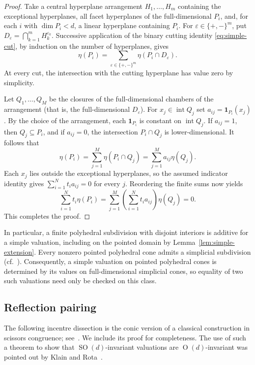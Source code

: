 \documentclass[11pt]{article}
\newcommand{\SOn}[1]{\operatorname{SO}(#1)}
\newcommand{\On}[1]{\operatorname{O}(#1)}
\newcommand{\inter}{\operatorname{int}}
\theoremstyle{plain}
\theoremstyle{definition}
\begin{document}
\begin{proof}
Take a central hyperplane arrangement $H_1,\ldots,H_m$ containing the exceptional
hyperplanes, all facet hyperplanes of the full-dimensional $P_i$,
and, for each $i$ with $\dim P_i<d$, a linear hyperplane containing $P_i$.
For $\varepsilon\in\{+,-\}^m$, put
$D_\varepsilon=\bigcap_{k=1}^m H_k^{\varepsilon_k}$.
Successive application of the binary cutting identity
\eqref{eq:simple-cut}, by induction on the number of hyperplanes, gives
\[
  \eta(P_i)=\sum_{\varepsilon\in\{+,-\}^m}
    \eta(P_i\cap D_\varepsilon).
\]
At every cut, the intersection with the cutting hyperplane has value
zero by simplicity.

Let $Q_1,\ldots,Q_M$ be the closures of the full-dimensional chambers of the arrangement (that is, the 
full-dimensional $D_\varepsilon$).
For $x_j\in\inter Q_j$ set $a_{ij}=\mathbf1_{P_i}(x_j)$.
By the choice of the arrangement, each $\mathbf1_{P_i}$ is constant on
$\inter Q_j$.  If $a_{ij}=1$, then $Q_j\subseteq P_i$, and 
if $a_{ij}=0$, the intersection $P_i\cap Q_j$ is lower-dimensional.
It follows that
\[
  \eta(P_i)=\sum_{j=1}^M\eta(P_i\cap Q_j)
           =\sum_{j=1}^M a_{ij}\eta(Q_j).
\]
Each $x_j$ lies outside the exceptional hyperplanes, so the assumed
indicator identity gives $\sum_{i=1}^N t_i a_{ij}=0$ for every $j$.
Reordering the finite sums now yields
\[
  \sum_{i=1}^N t_i\eta(P_i)
  =\sum_{j=1}^M\left(\sum_{i=1}^N t_i a_{ij}\right)\eta(Q_j)
  =0.
\]
This completes the proof.
\end{proof}

In particular, a finite polyhedral subdivision with disjoint interiors
is additive for a simple valuation, including on the pointed domain
by Lemma~\ref{lem:simple-extension}.  Every nonzero pointed polyhedral
cone admits a simplicial subdivision (cf.~\cite[Section~2.6, p.~48]{Fulton93:Toric-Varieties}).
Consequently, a simple valuation on pointed polyhedral cones is determined
by its values on full-dimensional simplicial cones, so equality of two
such valuations need only be checked on this class.

\subsection{Reflection pairing}

The following incentre dissection is the conic version of a classical
construction in scissors congruence; see~\cite{Sah79:Hilberts-Third}.
We include its proof for completeness. The use of such a theorem to show that
$\SOn d$-invariant valuations are $\On d$-invariant was pointed out by Klain and Rota~\cite[Section~11.2]{KR97:Introduction-Geometric}.
\end{document}

